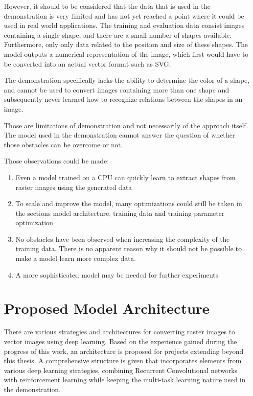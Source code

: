\documentclass[12pt, a4paper, titlepage]{report}
\begin{document}
However, it should to be considered that the data that is used in the demonstration is very limited and has not yet reached a point where it could be used in real world applications. The training and evaluation data consist images containing a single shape, and there are a small number of shapes available. Furthermore, only only data related to the position and size of these shapes. The model outputs a numerical representation of the image, which first would have to be converted into an actual vector format such as SVG.

The demonstration specifically lacks the ability to determine the color of a shape, and cannot be used to convert images containing more than one shape and subsequently never learned how to recognize relations between the shapes in an image.

\vspace{0.5cm}
Those are limitations of demonstration and not necessarily of the approach itself. The model used in the demonstration cannot answer the question of whether those obstacles can be overcome or not.

Those observations could be made:

\begin{enumerate}[label=\Roman*.]
   \item Even a model trained on a CPU can quickly learn to extract shapes from raster images using the generated data
   \item To scale and improve the model, many optimizations could still be taken in the sections model architecture, training data and training parameter optimization
   \item No obstacles have been observed when increasing the complexity of the training data. There is no apparent reason why it should not be possible to make a model learn more complex data.
   \item A more sophisticated model may be needed for further experiments
\end{enumerate}



\section{Proposed Model Architecture}

There are various strategies and architectures for converting raster images to vector images using deep learning. Based on the experience gained during the progress of this work, an architecture is proposed for projects extending beyond this thesis. A comprehensive structure is given that incorporates elements from various deep learning strategies, combining Recurrent Convolutional networks with reinforcement learning while keeping the multi-task learning nature used in the demonstration.
\end{document}
